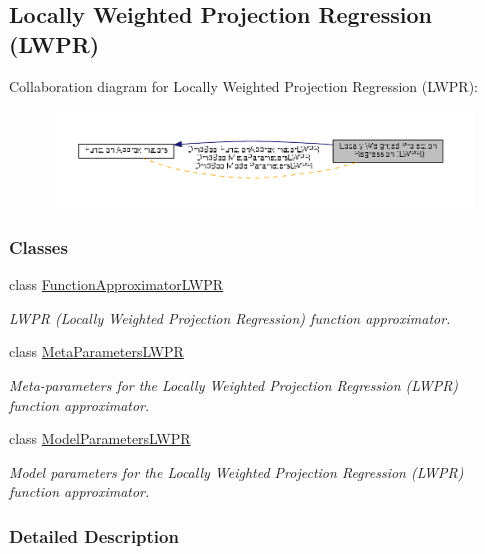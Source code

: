 \hypertarget{group__LWPR}{\subsection{Locally Weighted Projection Regression (L\+W\+P\+R)}
\label{group__LWPR}
}
Collaboration diagram for Locally Weighted Projection Regression (L\+W\+P\+R)\+:
\nopagebreak
\begin{figure}[H]
\begin{center}
\leavevmode
\includegraphics[width=350pt]{group__LWPR}
\end{center}
\end{figure}
\subsubsection*{Classes}
\begin{DoxyCompactItemize}
\item 
class \hyperlink{classDmpBbo_1_1FunctionApproximatorLWPR}{Function\+Approximator\+L\+W\+P\+R}
\begin{DoxyCompactList}\small\item\em L\+W\+P\+R (Locally Weighted Projection Regression) function approximator. \end{DoxyCompactList}\item 
class \hyperlink{classDmpBbo_1_1MetaParametersLWPR}{Meta\+Parameters\+L\+W\+P\+R}
\begin{DoxyCompactList}\small\item\em Meta-\/parameters for the Locally Weighted Projection Regression (L\+W\+P\+R) function approximator. \end{DoxyCompactList}\item 
class \hyperlink{classDmpBbo_1_1ModelParametersLWPR}{Model\+Parameters\+L\+W\+P\+R}
\begin{DoxyCompactList}\small\item\em Model parameters for the Locally Weighted Projection Regression (L\+W\+P\+R) function approximator. \end{DoxyCompactList}\end{DoxyCompactItemize}


\subsubsection{Detailed Description}
